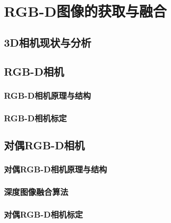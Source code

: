 \chapter{RGB-D图像的获取与融合}
\label{chap:rgbd}

\section{3D相机现状与分析}

\section{RGB-D相机}
\subsection{RGB-D相机原理与结构}

\subsection{RGB-D相机标定}

\section{对偶RGB-D相机}

\subsection{对偶RGB-D相机原理与结构}

\subsection{深度图像融合算法}

\subsection{对偶RGB-D相机标定}